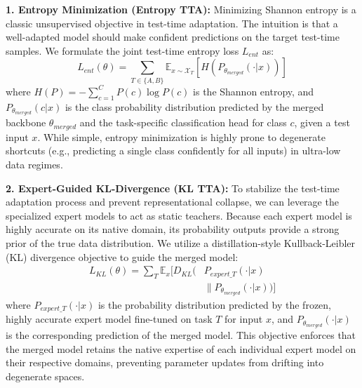 \documentclass{article}
\theoremstyle{plain}
\theoremstyle{definition}
\theoremstyle{remark}
\begin{document}
\textbf{1. Entropy Minimization (Entropy TTA):}
Minimizing Shannon entropy is a classic unsupervised objective in test-time adaptation. The intuition is that a well-adapted model should make confident predictions on the target test-time samples. We formulate the joint test-time entropy loss $L_{ent}$ as:
\begin{equation}
    L_{ent}(\theta) = \sum_{T \in \{A, B\}} \mathbb{E}_{x \sim \mathcal{X}_T} \left[ H\left(P_{\theta_{merged}}(\cdot|x)\right) \right]
\end{equation}
where $H(P) = -\sum_{c=1}^{C} P(c) \log P(c)$ is the Shannon entropy, and $P_{\theta_{merged}}(c|x)$ is the class probability distribution predicted by the merged backbone $\theta_{merged}$ and the task-specific classification head for class $c$, given a test input $x$. While simple, entropy minimization is highly prone to degenerate shortcuts (e.g., predicting a single class confidently for all inputs) in ultra-low data regimes.

\textbf{2. Expert-Guided KL-Divergence (KL TTA):}
To stabilize the test-time adaptation process and prevent representational collapse, we can leverage the specialized expert models to act as static teachers. Because each expert model is highly accurate on its native domain, its probability outputs provide a strong prior of the true data distribution. We utilize a distillation-style Kullback-Leibler (KL) divergence objective to guide the merged model:
\begin{equation}
\begin{split}
    L_{KL}(\theta) = \sum_{T} \mathbb{E}_{x} \Big[ D_{KL} \big( & P_{expert\_T}(\cdot|x) \\
    & \parallel P_{\theta_{merged}}(\cdot|x) \big) \Big]
\end{split}
\end{equation}
where $P_{expert\_T}(\cdot|x)$ is the probability distribution predicted by the frozen, highly accurate expert model fine-tuned on task $T$ for input $x$, and $P_{\theta_{merged}}(\cdot|x)$ is the corresponding prediction of the merged model. This objective enforces that the merged model retains the native expertise of each individual expert model on their respective domains, preventing parameter updates from drifting into degenerate spaces.
\end{document}
